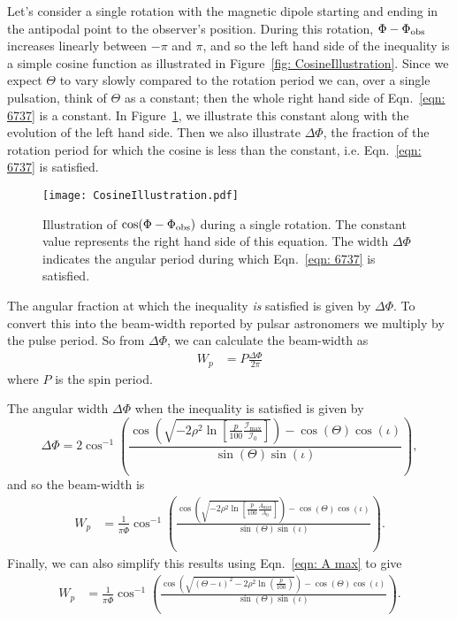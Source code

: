 \documentclass[../full_thesis/full_thesis.tex]{subfiles}
\begin{document}
Let's consider a single rotation with the magnetic dipole starting and ending in
the antipodal point to the observer's position. During this rotation, $\Phi -
\Phi_{\mathrm{obs}}$ increases linearly between $-\pi$ and $\pi$, and so the left hand side of the
inequality is a simple cosine function as illustrated in Figure~\ref{fig:
CosineIllustration}.  Since we expect $\Theta$ to vary slowly compared to the
rotation period we can, over a single pulsation, think of $\Theta$ as a
constant; then the whole right hand side of Eqn.~\eqref{eqn: 6737} is a
constant. In Figure~\ref{fig: CosineIllustration}, we illustrate this constant
along with the evolution of the left hand side. Then we also illustrate $\Delta\Phi$,
the fraction of the rotation period for which the cosine is less than the
constant, i.e. Eqn.~\eqref{eqn: 6737} is satisfied.
\begin{figure}[ht]
\centering
\texttt{[image: CosineIllustration.pdf]}
\caption{Illustration of $\cos(\Phi-\Phi_{\mathrm{obs}})$ during a single rotation. The constant
         value represents the right hand side of this equation. The
         width $\Delta\Phi$ indicates the angular period during which
         Eqn.~\eqref{eqn: 6737} is satisfied.}
\label{fig: CosineIllustration}
\end{figure}

The angular fraction at which the inequality \emph{is} satisfied is given by
$\Delta\Phi$. To convert this into the beam-width reported by pulsar
astronomers we multiply by the pulse period. So from $\Delta\Phi$, we can
calculate the beam-width as
\begin{align}
    W_{p} & = P \frac{\Delta\Phi}{2\pi}
\end{align}
where $P$ is the spin period.

The angular width $\Delta\Phi$ when the inequality is satisfied is given by
\begin{equation}
    \Delta\Phi = 2\cos^{-1}\left(
                \frac{
\cos\left(\sqrt{-2\rho^{2}\ln\left[\frac{p}{100}\frac{\mathcal{I}_{\mathrm{max}}}{\mathcal{I}_0}\right]}\right) - \cos(\Theta)\cos(\iota)}
                          {\sin(\Theta)\sin(\iota)}
                      \right),
\end{equation}
and so the beam-width is
\begin{align}
    W_{p} & = \frac{1}{\pi\dot{\Phi}}
               \cos^{-1}\left(
                   \frac{\cos\left(
\sqrt{-2\rho^{2}\ln\left[\frac{p}{100}\frac{A_{\mathrm{max}}}{A_0}\right]}
\right) - \cos(\Theta)\cos(\iota)}
                          {\sin(\Theta)\sin(\iota)}
                  \right).
\end{align}
Finally, we can also simplify this results using Eqn.~\eqref{eqn: A max} to give
\begin{align}
    W_{p} & = \frac{1}{\pi\dot{\Phi}}
               \cos^{-1}\left(
                   \frac{\cos\left(
\sqrt{(\Theta-\iota)^2 - 2\rho^2 \ln\left(\frac{p}{100}\right)}
\right) - \cos(\Theta)\cos(\iota)}
                          {\sin(\Theta)\sin(\iota)}
                  \right).
\label{eqn: Wp}
\end{align}
\end{document}
